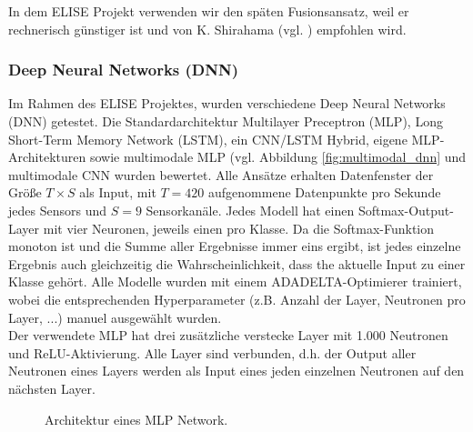 In dem ELISE Projekt verwenden wir den sp{\"a}ten Fusionsansatz, weil er rechnerisch g{\"u}nstiger ist und von K. Shirahama (vgl. \cite{kimiaki_codebook_approach_2016}) empfohlen wird. \\













\subsubsection{Deep Neural Networks (DNN)} \label{dnn-1}
Im Rahmen des ELISE Projektes, wurden verschiedene Deep Neural Networks (DNN) getestet\cite{bscschnieber18}.
Die Standardarchitektur Multilayer Preceptron (MLP), Long Short-Term Memory Network (LSTM), ein CNN/LSTM Hybrid, eigene MLP-Architekturen sowie multimodale MLP (vgl. Abbildung \ref{fig:multimodal_dnn} und multimodale CNN wurden bewertet.
Alle Ansätze erhalten Datenfenster der Größe $T \times S$ als Input, mit $T = 420$ aufgenommene Datenpunkte pro Sekunde jedes Sensors und $S = 9$ Sensorkanäle. 
Jedes Modell hat einen Softmax-Output-Layer mit vier Neuronen, jeweils einen pro Klasse.
Da die Softmax-Funktion monoton ist und die Summe aller Ergebnisse immer eins ergibt, ist jedes einzelne Ergebnis auch gleichzeitig die Wahrscheinlichkeit, dass the aktuelle Input zu einer Klasse gehört.
Alle Modelle wurden mit einem ADADELTA-Optimierer\cite{zeiler12} trainiert, wobei die entsprechenden Hyperparameter (z.B. Anzahl der Layer, Neutronen pro Layer, ...) manuel ausgewählt wurden. \\

Der verwendete MLP hat drei zusätzliche verstecke Layer mit 1.000 Neutronen und ReLU-Aktivierung\cite{nair12}.
Alle Layer sind verbunden, d.h. der Output aller Neutronen eines Layers werden als Input eines jeden einzelnen Neutronen auf den nächsten Layer. \\



\begin{figure}[H]
\caption{Architektur eines MLP Network. }
\label{fig:mlp} \end{figure} \vspace{0.5cm}



